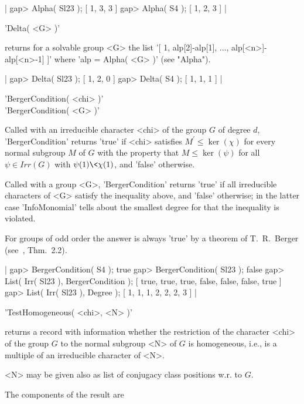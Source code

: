 |    gap> Alpha( Sl23 );
    [ 1, 3, 3 ]
    gap> Alpha( S4 );
    [ 1, 2, 3 ] |


'Delta( <G> )'

returns for a solvable group <G> the list
'[ 1, alp[2]-alp[1], ..., alp[<n>]-alp[<n>-1] ]'
where 'alp = Alpha( <G> )' (see "Alpha").

|    gap> Delta( Sl23 );
    [ 1, 2, 0 ]
    gap> Delta( S4 );
    [ 1, 1, 1 ] |
    

'BergerCondition( <chi> )'\\
'BergerCondition(  <G>  )'

Called with an irreducible character <chi> of the group $G$ of degree $d$,
'BergerCondition' returns 'true' if <chi> satisfies
$M^{\prime} \leq \ker(\chi)$ for every normal subgroup $M$ of $G$ with the
property that $M \leq \ker(\psi)$ for all $\psi \in Irr(G)$ with
$\psi(1) \< \chi(1)$, and 'false' otherwise.

Called with a group <G>, 'BergerCondition' returns 'true' if all irreducible
characters of <G> satisfy the inequality above, and 'false' otherwise;
in the latter case 'InfoMonomial' tells about the smallest degree for that the
inequality is violated.

For groups of odd order the answer is always 'true' by a theorem of
T.~R.~Berger (see~\cite{Ber76}, Thm.~2.2).

|    gap> BergerCondition( S4 );
    true
    gap> BergerCondition( Sl23 );
    false
    gap> List( Irr( Sl23 ), BergerCondition );
    [ true, true, true, false, false, false, true ]
    gap> List( Irr( Sl23 ), Degree );
    [ 1, 1, 1, 2, 2, 2, 3 ] |


'TestHomogeneous( <chi>, <N> )'

returns a record with information whether the restriction of the character
<chi> of the group $G$ to the normal subgroup <N> of $G$ is homogeneous,
i.e., is a multiple of an irreducible character of <N>.

<N> may be given also as list of conjugacy class positions w.r. to $G$.

The components of the result are

